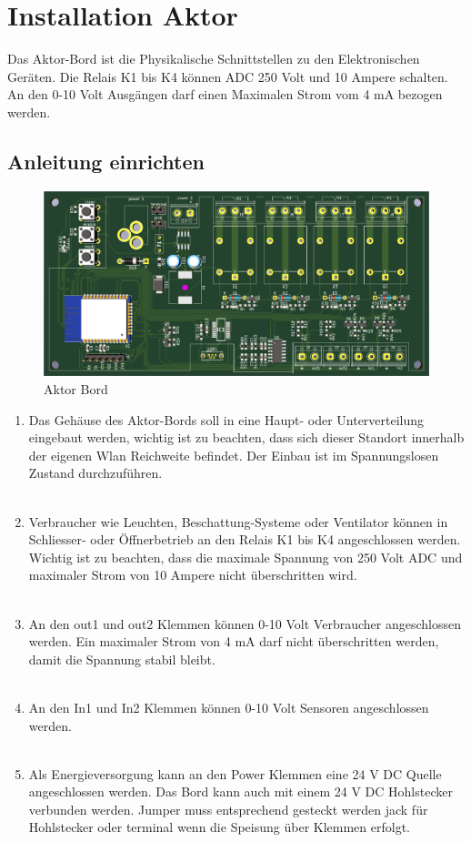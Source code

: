 \clearpage
\section{Installation Aktor}\label{sec:Aktor}
Das Aktor-Bord ist die Physikalische Schnittstellen zu den Elektronischen Geräten. Die Relais K1 bis K4 können ADC 250 Volt und 10 Ampere schalten. An den 0-10 Volt Ausgängen darf einen Maximalen Strom vom 4 mA bezogen werden.
\subsection{Anleitung einrichten}
\begin{figure}[H]
	\centering
	\includegraphics[width=\textwidth]{graphics/Aktorbaustein.png}
	\caption{Aktor Bord} 	
	\label{pic: OSGILayers}
\end{figure} 

\begin{enumerate}
	\item Das Gehäuse des Aktor-Bords soll in eine Haupt- oder Unterverteilung eingebaut werden, wichtig ist zu beachten, dass sich dieser Standort innerhalb der eigenen Wlan Reichweite befindet. Der Einbau ist im Spannungslosen Zustand durchzuführen. \\
	\\
	\item Verbraucher wie Leuchten, Beschattung-Systeme oder Ventilator können in Schliesser- oder Öffnerbetrieb an den Relais K1 bis K4 angeschlossen werden. Wichtig ist zu beachten, dass die maximale Spannung von 250 Volt ADC und maximaler Strom von 10 Ampere nicht überschritten wird.\\
		\\
	\item An den out1 und out2 Klemmen können 0-10 Volt Verbraucher angeschlossen werden. Ein maximaler Strom von 4 mA darf nicht überschritten werden, damit die Spannung stabil bleibt.\\
	\\
	\item An den In1 und In2 Klemmen können 0-10 Volt Sensoren angeschlossen werden.\\
	\\
	\item Als Energieversorgung kann an den Power Klemmen eine 24 V DC Quelle angeschlossen werden. Das Bord kann auch mit einem 24 V DC Hohlstecker verbunden werden. Jumper muss entsprechend gesteckt werden jack für Hohlstecker oder terminal wenn die Speisung über Klemmen erfolgt. 
\end{enumerate}

